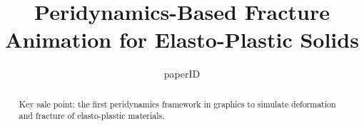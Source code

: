 

\title[Peridynamics-Based Fracture Animation for Elasto-Plastic Solids]%
      {Peridynamics-Based Fracture Animation for Elasto-Plastic Solids}

\author[paperID]{paperID}



%





\maketitle

\begin{abstract}
Key sale point:
the first peridynamics framework in graphics to simulate deformation and fracture of elasto-plastic materials.
\begin{classification} %
\end{classification}

\end{abstract}





